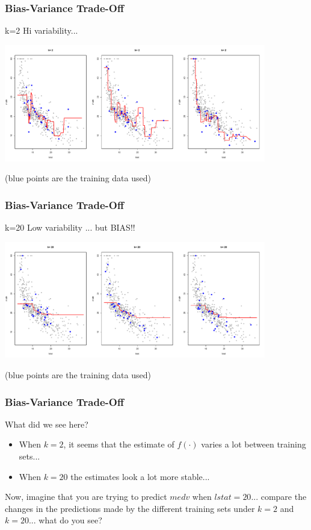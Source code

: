 \documentclass[flegn]{beamer}
\newcommand{\skoo}{\vspace{.2in}}
\begin{document}
\begin{frame}
\frametitle{Bias-Variance Trade-Off}
{\color{red} k=2}  Hi variability...
\begin{center}
\includegraphics[width=4.5in]{knn2VAR}
\end{center}
({\color{blue}blue points} are the training data used)
\end{frame}

\begin{frame}
\frametitle{Bias-Variance Trade-Off}
{\color{red} k=20} Low variability ... but BIAS!!
\begin{center}
\includegraphics[width=4.5in]{knn20VAR}
\end{center}
({\color{blue}blue points} are the training data used)
\end{frame}

\begin{frame}
\frametitle{Bias-Variance Trade-Off}
{\color{blue}What did we see here?}

\begin{itemize}
\item When $k=2$, it seems that the estimate of $f(\cdot)$ varies a lot between training sets...
\item When $k=20$ the estimates look a lot more stable...
\end{itemize}

\skoo

{\color{red}
Now, imagine that you are trying to predict $medv$ when $lstat=20$... compare the changes in the predictions made by the different training sets under $k=2$ and $k=20$... what do you see? 
}
\end{frame}
\end{document}
